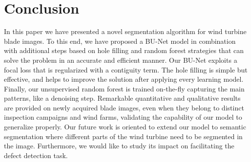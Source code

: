 \vspace{-0.1cm}
\section{Conclusion}
\vspace{-0.1cm}

In this paper we have presented a novel segmentation algorithm for wind turbine blade images. To this end, we have proposed a BU-Net model in combination with additional steps based on hole filling and random forest strategies that can solve the problem in an accurate and efficient manner. Our BU-Net exploits a focal loss that is regularized with a contiguity term. The hole filling is simple but effective, and helps to improve the solution after applying every learning model. Finally, our unsupervised random forest is trained on-the-fly capturing the main patterns, like a denoising step. Remarkable quantitative and qualitative results are provided on newly acquired blade images, even when they belong to distinct inspection campaigns and wind farms, validating the capability of our model to generalize properly. Our future work is oriented to extend our model to semantic segmentation where different parts of the wind turbine need to be segmented in the image. Furthermore, we would like to study its impact on facilitating the defect detection task.









